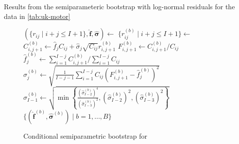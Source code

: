 \documentclass[a4paper]{book}
\begin{document}
\begin{table}[!htb]
  \begin{subtable}{0.5\linewidth}
    
  \end{subtable}
  \hfill
  \begin{subtable}{0.5\linewidth}
    
  \end{subtable}
  \caption{Results from the semiparameteric bootstrap with log-normal residuals for the data in \cref{tab:uk-motor}}
  \label{tab:semiparam-mack-res-log-normal}
\end{table}

\begin{figure}[p]
  \begin{algorithm}[H]
    \caption{Conditional semiparametric bootstrap for }
    \label{alg:cond-semiparam-mack}
    \begin{algorithmic}
      \State $(\{ r_{ij} \mid i + j \leq I + 1 \}, \bm{\widehat{f}}, \bm{\widehat{\sigma}}) \gets$ 
        \State $\{ r^{(b)}_{ij} \mid i + j \leq I + 1 \} \gets$ 
            \State $C^{(b)}_{i, j + 1} \gets \widehat{f}_j C_{ij} + \widehat{\sigma}_j \sqrt{C_{ij}} r^{(b)}_{i, j + 1}$
            \State $F^{(b)}_{i, j + 1} \gets C^{(b)}_{i, j + 1} / C_{ij}$
          \EndFor
          \State $\widehat{f}^{(b)}_j \gets \sum_{i = 1}^{I - j} C^{(b)}_{i, j + 1} / \sum_{i = 1}^{I - j} C_{ij}$
            \State $\widehat{\sigma}^{(b)}_j \gets \sqrt{\frac{1}{I - j - 1}\sum_{i = 1}^{I - j} C_{ij} \left( F^{(b)}_{i, j + 1} - \widehat{f}^{(b)}_j \right)^2}$
          \Else
            \State $\widehat{\sigma}^{(b)}_{I - 1} \gets \sqrt{\min{ \left \{ \frac{(\widehat{\sigma}^{(b)}_{I - 2})^4}{(\widehat{\sigma}^{(b)}_{I - 3})^2}, (\widehat{\sigma}^{(b)}_{I - 2})^2, (\widehat{\sigma}^{(b)}_{I - 3})^2 \right \} }}$
          \EndIf
        \EndFor
      \EndFor
      \State \Return $\{ (\widehat{\bm{f}}^{(b)}, \widehat{\bm{\sigma}}^{(b)}) \mid b = 1, \dots, B \}$
    \end{algorithmic}
  \end{algorithm}
  \begin{algorithm}[H]

\end{algorithm}
\end{figure}
\end{document}

